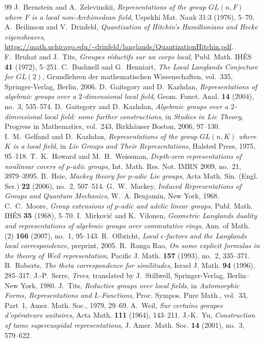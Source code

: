 \documentclass[11pt,a4paper,twoside]{amsart}
\theoremstyle{definition}
\theoremstyle{remark}
\begin{document}
\begin{thebibliography}{99}
J.~Bernstein and A.~Zelevinskii,
{\em Representations of the group $GL(n,F)$ where $F$ is a local non-Archimedean field},
Uspekhi Mat. Nauk 31:3 (1976), 5--70.
A.~Beilinson and V.~Drinfeld,
{\em Quantization of Hitchin's Hamiltonians and Hecke eigensheaves},
\url{https://math.uchicago.edu/~drinfeld/langlands/QuantizationHitchin.pdf}.
F.~Bruhat and J.~Tits,
{\em Groupes r\'eductifs sur un corps local},
Publ. Math. IH\'ES {\bf 41} (1972), 5--251.
C.~Bushnell and G.~Henniart,
{\em The Local Langlands Conjecture for $GL(2)$},
Grundlehren der mathematischen Wissenschaften, vol.~335, Springer-Verlag, Berlin, 2006.
D.~Gaitsgory and D.~Kazhdan,
{\em Representations of algebraic groups over a $2$-dimensional local field},
Geom. Funct. Anal. {\bf 14} (2004), no.~3, 535--574.
D.~Gaitsgory and D.~Kazhdan,
{\em Algebraic groups over a $2$-dimensional local field: some further constructions},
in {\em Studies in Lie Theory}, Progress in Mathematics, vol.~243,
Birkh\"auser Boston, 2006, 97--130.
I.~M.~Gelfand and D.~Kazhdan,
{\em Representations of the group $GL(n,K)$ where $K$ is a local field},
in {\em Lie Groups and Their Representations}, Halsted Press, 1975, 95--118.
T.~K.~Howard and M.~H.~Weissman,
{\em Depth-zero representations of nonlinear covers of $p$-adic groups},
Int. Math. Res. Not. IMRN 2009, no.~21, 3979--3995.
B.~Hsie,
{\em Mackey theory for $p$-adic Lie groups},
Acta Math. Sin. (Engl. Ser.) {\bf 22} (2006), no.~2, 507--514.
G.~W.~Mackey,
{\em Induced Representations of Groups and Quantum Mechanics},
W.~A. Benjamin, New York, 1968.
C.~C.~Moore,
{\em Group extensions of $p$-adic and adelic linear groups},
Publ. Math. IH\'ES {\bf 35} (1968), 5--70.
I.~Mirkovi\'c and K.~Vilonen,
{\em Geometric Langlands duality and representations of algebraic groups over commutative rings},
Ann. of Math. (2) {\bf 166} (2007), no.~1, 95--143.
R.~Olbricht,
{\em Local $\epsilon$-factors and the Langlands local correspondence}, preprint, 2005.
R.~Ranga Rao,
{\em On some explicit formulas in the theory of Weil representation},
Pacific J. Math. {\bf 157} (1993), no.~2, 335--371.
B.~Roberts,
{\em The theta correspondence for similitudes},
Israel J. Math. {\bf 94} (1996), 285--317.
J.-P.~Serre,
{\em Trees}, translated by J.~Stillwell,
Springer-Verlag, Berlin--New York, 1980.
J.~Tits,
{\em Reductive groups over local fields},
in {\em Automorphic Forms, Representations and $L$-Functions},
Proc. Sympos. Pure Math., vol.~33, Part~1, Amer. Math. Soc., 1979, 29--69.
A.~Weil,
{\em Sur certains groupes d'op\'erateurs unitaires},
Acta Math. {\bf 111} (1964), 143--211.
J.-K.~Yu,
{\em Construction of tame supercuspidal representations},
J. Amer. Math. Soc. {\bf 14} (2001), no.~3, 579--622.
\end{thebibliography}
\end{document}
